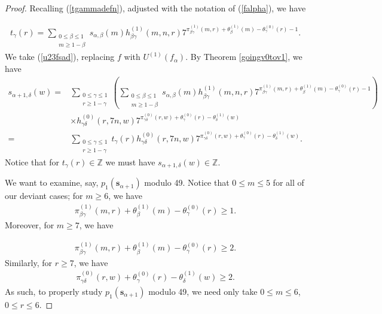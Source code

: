 \documentclass[reqno]{amsart}
\theoremstyle{definition}
\theoremstyle{remark}
\numberwithin{equation}{section}
\begin{document}
\begin{proof}

Recalling (\ref{tgammadefn}), adjusted with the notation of (\ref{falpha}), we have

\begin{align*}
t_{\gamma}(r) = \sum_{\substack{0\le\beta\le 1\\ m\ge 1-\beta}} s_{\alpha,\beta}(m)h^{(1)}_{\beta\gamma}(m,n,r)7^{\pi^{(1)}_{\beta\gamma}(m,r)+\theta^{(1)}_{\beta}(m) - \theta^{(0)}_{\gamma}(r) -1}.
\end{align*}  We take (\ref{u23fsad}), replacing $f$ with $U^{(1)}(f_{\alpha})$.  By Theorem \ref{goingv0tov1}, we have
\begin{align*}
s_{\alpha+1,\delta}(w) =& \sum_{\substack{0\le\gamma\le 1\\ r\ge 1-\gamma}}\left(\sum_{\substack{0\le\beta\le 1\\ m\ge 1-\beta}} s_{\alpha,\beta}(m)h^{(1)}_{\beta\gamma}(m,n,r)7^{\pi^{(1)}_{\beta\gamma}(m,r)+\theta^{(1)}_{\beta}(m) - \theta^{(0)}_{\gamma}(r) -1}\right)\\ &\times h^{(0)}_{\gamma\delta}(r,7n,w) 7^{\pi^{(0)}_{\gamma\delta}(r,w) + \theta^{(0)}_{\gamma}(r) -\theta^{(1)}_{\delta}(w)}\\
=& \sum_{\substack{0\le\gamma\le 1\\ r\ge 1-\gamma}}t_{\gamma}(r) h^{(0)}_{\gamma\delta}(r,7n,w) 7^{\pi^{(0)}_{\gamma\delta}(r,w) + \theta^{(0)}_{\gamma}(r) -\theta^{(1)}_{\delta}(w)}.
\end{align*}  Notice that for $t_{\gamma}(r)\in\mathbb{Z}$ we must have $s_{\alpha+1,\delta}(w)\in\mathbb{Z}$.  

We want to examine, say, $p_1(\mathbf{s}_{\alpha+1})$ modulo 49.  Notice that $0\le m\le 5$ for all of our deviant cases; for $m\ge 6$, we have 
\begin{align*}
\pi^{(1)}_{\beta\gamma}(m,r)+\theta^{(1)}_{\beta}(m) - \theta^{(0)}_{\gamma}(r)\ge 1.
\end{align*}   Moreover, for $m\ge 7$, we have

\begin{align*}
\pi^{(1)}_{\beta\gamma}(m,r)+\theta^{(1)}_{\beta}(m) - \theta^{(0)}_{\gamma}(r)\ge 2.
\end{align*}  Similarly, for $r\ge 7$, we have
\begin{align*}
\pi^{(0)}_{\gamma\delta}(r,w)+\theta^{(0)}_{\gamma}(r) - \theta^{(1)}_{\delta}(w)\ge 2.
\end{align*}  As such, to properly study $p_1(\mathbf{s}_{\alpha+1})$ modulo 49, we need only take $0\le m\le 6$, $0\le r\le 6$.


\end{proof}
\end{document}
